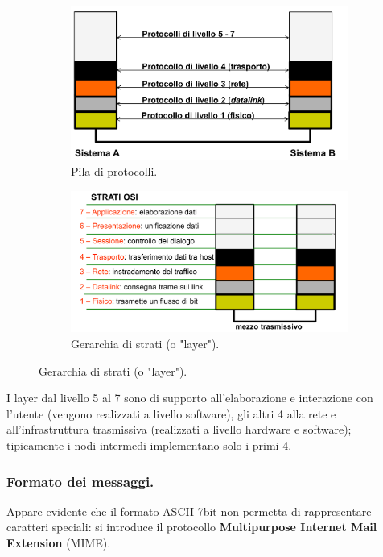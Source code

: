 \documentclass[11pt, italian, openany]{book}
\begin{document}
\begin{sloppypar}
\begin{figure}[h!]
	\begin{subfigure}{0.49 \linewidth} \centering
		\includegraphics[scale=0.22]{images/stack-protocollare-iso_osi.png}
		\caption{Pila di protocolli.}
	\end{subfigure}
	\begin{subfigure}{0.49 \linewidth} \centering
		\includegraphics[scale=0.22]{images/gerarchia-layer-iso_osi.png}
		\caption{Gerarchia di strati (o "layer").}
	\end{subfigure}
\end{figure}

I layer dal livello 5 al 7 sono di supporto all'elaborazione e interazione con l'utente (vengono realizzati a livello software), gli altri 4
alla rete e all'infrastruttura trasmissiva (realizzati a livello hardware e software); tipicamente i nodi intermedi implementano solo i primi
4.

\pagebreak

\subsubsection*{Formato dei messaggi.}
Appare evidente che il formato ASCII 7bit non permetta di rappresentare caratteri speciali: si introduce il protocollo \textbf{Multipurpose
Internet Mail Extension} (MIME). 


\end{sloppypar}
\end{document}
